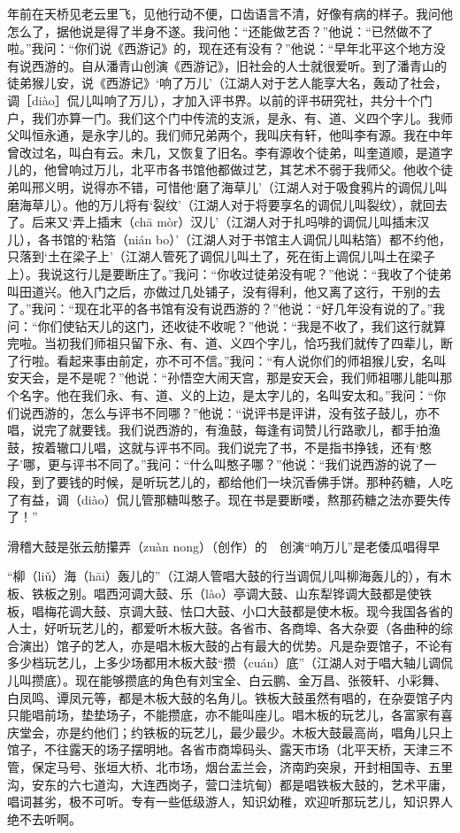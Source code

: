 \documentclass[12pt,UTF8]{ctexbook}
\begin{document}
年前在天桥见老云里飞，见他行动不便，口齿语言不清，好像有病的样子。我问他怎么了，据他说是得了半身不遂。我问他：“还能做艺否？”他说：“已然做不了啦。”我问：“你们说《西游记》的，现在还有没有？”他说：“早年北平这个地方没有说西游的。自从潘青山创演《西游记》，旧社会的人士就很爱听。到了潘青山的徒弟猴儿安，说《西游记》‘响了万儿’（江湖人对于艺人能享大名，轰动了社会，调［diào］侃儿叫响了万儿），才加入评书界。以前的评书研究社，共分十个门户，我们亦算一门。我们这个门中传流的支派，是永、有、道、义四个字儿。我师父叫恒永通，是永字儿的。我们师兄弟两个，我叫庆有轩，他叫李有源。我在中年曾改过名，叫白有云。未几，又恢复了旧名。李有源收个徒弟，叫奎道顺，是道字儿的，他曾响过万儿，北平市各书馆他都做过艺，其艺术不弱于我师父。他收个徒弟叫邢义明，说得亦不错，可惜他‘磨了海草儿’（江湖人对于吸食鸦片的调侃儿叫磨海草儿）。他的万儿将有‘裂纹’（江湖人对于将要享名的调侃儿叫裂纹），就回去了。后来又‘弄上插末（chā mòr）汉儿’（江湖人对于扎吗啡的调侃儿叫插末汉儿），各书馆的‘粘箔（nián bo）’（江湖人对于书馆主人调侃儿叫粘箔）都不约他，只落到‘土在梁子上’（江湖人管死了调侃儿叫土了，死在街上调侃儿叫土在梁子上）。我说这行儿是要断庄了。”我问：“你收过徒弟没有呢？”他说：“我收了个徒弟叫田道兴。他入门之后，亦做过几处铺子，没有得利，他又离了这行，干别的去了。”我问：“现在北平的各书馆有没有说西游的？”他说：“好几年没有说的了。”我问：“你们使钻天儿的这门，还收徒不收呢？”他说：“我是不收了，我们这行就算完啦。当初我们师祖只留下永、有、道、义四个字儿，恰巧我们就传了四辈儿，断了行啦。看起来事由前定，亦不可不信。”我问：“有人说你们的师祖猴儿安，名叫安天会，是不是呢？”他说：“孙悟空大闹天宫，那是安天会，我们师祖哪儿能叫那个名字。他在我们永、有、道、义的上边，是太字儿的，名叫安太和。”我问：“你们说西游的，怎么与评书不同哪？”他说：“说评书是评讲，没有弦子鼓儿，亦不唱，说完了就要钱。我们说西游的，有渔鼓，每逢有词赞儿行路歌儿，都手拍渔鼓，按着辙口儿唱，这就与评书不同。我们说完了书，不是指书挣钱，还有‘憨子’哪，更与评书不同了。”我问：“什么叫憨子哪？”他说：“我们说西游的说了一段，到了要钱的时候，是听玩艺儿的，都给他们一块沉香佛手饼。那种药糖，人吃了有益，调（diào）侃儿管那糖叫憨子。现在书是要断喽，熬那药糖之法亦要失传了！”





滑稽大鼓是张云舫攥弄（zuàn nong）（创作）的　创演“响万儿”是老倭瓜唱得早


“柳（liǔ）海（hāi）轰儿的”（江湖人管唱大鼓的行当调侃儿叫柳海轰儿的），有木板、铁板之别。唱西河调大鼓、乐（lào）亭调大鼓、山东犁铧调大鼓都是使铁板，唱梅花调大鼓、京调大鼓、怯口大鼓、小口大鼓都是使木板。现今我国各省的人士，好听玩艺儿的，都爱听木板大鼓。各省市、各商埠、各大杂耍（各曲种的综合演出）馆子的艺人，亦是唱木板大鼓的占有最大的优势。凡是杂耍馆子，不论有多少档玩艺儿，上多少场都用木板大鼓“攒（cuán）底”（江湖人对于唱大轴儿调侃儿叫攒底）。现在能够攒底的角色有刘宝全、白云鹏、金万昌、张筱轩、小彩舞、白凤鸣、谭凤元等，都是木板大鼓的名角儿。铁板大鼓虽然有唱的，在杂耍馆子内只能唱前场，垫垫场子，不能攒底，亦不能叫座儿。唱木板的玩艺儿，各富家有喜庆堂会，亦是约他们；约铁板的玩艺儿，最少最少。木板大鼓最高尚，唱角儿只上馆子，不往露天的场子摆明地。各省市商埠码头、露天市场（北平天桥，天津三不管，保定马号、张垣大桥、北市场，烟台盂兰会，济南趵突泉，开封相国寺、五里沟，安东的六七道沟，大连西岗子，营口洼坑甸）都是唱铁板大鼓的，艺术平庸，唱词甚劣，极不可听。专有一些低级游人，知识幼稚，欢迎听那玩艺儿，知识界人绝不去听啊。
\end{document}
